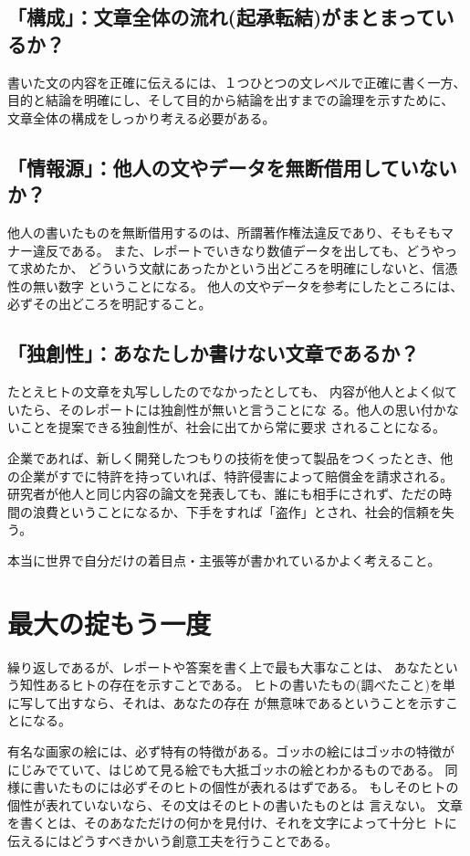 \documentclass[12pt]{jarticle}
\begin{document}
\subsection{「構成」：文章全体の流れ(起承転結)がまとまっているか？}

書いた文の内容を正確に伝えるには、１つひとつの文レベルで正確に書く一方、
目的と結論を明確にし、そして目的から結論を出すまでの論理を示すために、
文章全体の構成をしっかり考える必要がある。

\subsection{「情報源」：他人の文やデータを無断借用していないか？}

他人の書いたものを無断借用するのは、所謂著作権法違反であり、そもそもマ
ナー違反である。 
また、レポートでいきなり数値データを出しても、どうやって求めたか、
どういう文献にあったかという出どころを明確にしないと、信憑性の無い数字
ということになる。
他人の文やデータを参考にしたところには、必ずその出どころを明記すること。

\subsection{「独創性」：あなたしか書けない文章であるか？}

たとえヒトの文章を丸写ししたのでなかったとしても、
内容が他人とよく似ていたら、そのレポートには独創性が無いと言うことにな
る。他人の思い付かないことを提案できる独創性が、社会に出てから常に要求
されることになる。

企業であれば、新しく開発したつもりの技術を使って製品をつくったとき、他
の企業がすでに特許を持っていれば、特許侵害によって賠償金を請求される。
研究者が他人と同じ内容の論文を発表しても、誰にも相手にされず、ただの時
間の浪費ということになるか、下手をすれば「盗作」とされ、社会的信頼を失
う。

本当に世界で自分だけの着目点・主張等が書かれているかよく考えること。

\section{最大の掟もう一度}

繰り返しであるが、レポートや答案を書く上で最も大事なことは、
あなたという知性あるヒトの存在を示すことである。
ヒトの書いたもの(調べたこと)を単に写して出すなら、それは、あなたの存在
が無意味であるということを示すことになる。

有名な画家の絵には、必ず特有の特徴がある。ゴッホの絵にはゴッホの特徴が
にじみでていて、はじめて見る絵でも大抵ゴッホの絵とわかるものである。
同様に書いたものには必ずそのヒトの個性が表れるはずである。
もしそのヒトの個性が表れていないなら、その文はそのヒトの書いたものとは
言えない。
文章を書くとは、そのあなただけの何かを見付け、それを文字によって十分ヒ
トに伝えるにはどうすべきかいう創意工夫を行うことである。
\end{document}
